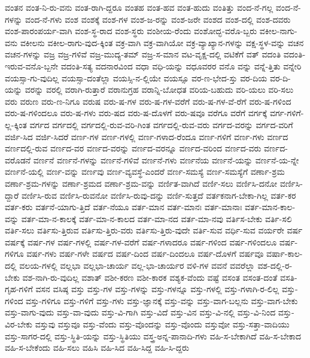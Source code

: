 {ವಂತನ
ವಂತ-ನಿ-ರು-ವನು
ವಂತ-ರಾಗಿ-ದ್ದರೂ
ವಂತಹ
ವಂತ-ಹವ
ವಂತ-ಹುದು
ವಂತಿತ್ತು
ವಂದ-ನೆ-ಗಲ್ಲ
ವಂದ-ನೆ-ಗಳನ್ನು
ವಂದ-ನೆ-ಗಳು
ವಂಶ
ವಂಶಕ್ಕೆ
ವಂಶ-ಗಳ
ವಂಶ-ಜ-ರನ್ನು
ವಂಶ-ಜರೇ
ವಂಶದ
ವಂಶ-ದಲ್ಲಿ
ವಂಶ-ದವರು
ವಂಶ-ಪಾರಂಪರ್ಯ-ವಾಗಿ
ವಂಶ-ಸ್ಥ-ರಾದ
ವಂಶ-ಸ್ಥರು
ವಂಶೀಯ-ರೆಂದು
ವಂಶೋದ್ಭ-ವರೊ-ಬ್ಬರು
ವಕೀಲ-ನಾಗು-ವನು
ವಕೀಲನು
ವಕೀಲ-ರಾಗು-ವುದ-ಕ್ಕಿಂತ
ವಕ್ರ-ವಾಗಿ
ವಕ್ರ-ವಾಗಿಯೋ
ವಕ್ರ-ವ್ಯಾಖ್ಯಾನ-ಗಳನ್ನು
ವಕ್ಷ-ಸ್ಥಳ-ವನ್ನು
ವಚನ
ವಚನ-ಗಳನ್ನು
ವಜ್ರ
ವಜ್ರ-ಗಳಿವೆ
ವಜ್ರ-ಮುದ್ಯ-ತಮ್
ವಜ್ರ-ಸ-ಮಾನ
ವಟ-ವೃಕ್ಷ-ದಲ್ಲಿ
ವಟಿಕೆಗೆ
ವತ್
ವದಂತಿ
ವದಂತಿ-ಇರುವ-ವನೊ-ಬ್ಬನೇ
ವದಂತಿ-ಸತ್ಯ
ವದನಾರವಿಂದ
ವಧಾ
ವಧಿ-ಯನ್ನು
ವಧೂವರರ
ವನೊ
ವನ್ನು
ವನ್ನೆ-ತ್ತಿತು
ವನ್ನೇರಿ
ವಯಸ್ಸಾ-ಗು-ವುದಿಲ್ಲ
ವಯಸ್ಸಾ-ದಂತೆಲ್ಲಾ
ವಯಸ್ಸಿ-ನ-ಲ್ಲಿಯೇ
ವಯಸ್ಸೂ
ವರ-ಣ-ಭೇದ-ಸ್ತು
ವರ-ದಿಯ
ವರ-ದಿ-ಯನ್ನು
ವರನ್ನು
ವರಲ್ಲಿ
ವರಾಗಿ-ರುತ್ತಾರೆ
ವರಾನುಗ್ರಹ
ವರಾನ್ನಿ-ಬೋಧತ
ವರಿಯ-ಬಹುದು
ವರಿ-ಯಲು
ವರಿ-ಸಲು
ವರು
ವರುಣ
ವರು-ಣ-ನಿಗೂ
ವರುಷ
ವರು-ಷ-ಗಳ
ವರು-ಷ-ಗಳ-ವರೆಗೆ
ವರು-ಷ-ಗಳ-ವೆ-ರೆಗೆ
ವರು-ಷ-ಗಳಿಂದ
ವರು-ಷ-ಗಳಿಂದಲೂ
ವರು-ಷ-ಗಳು
ವರು-ಷದ
ವರು-ಷ-ದೊಳಗೆ
ವರು-ಷವೂ
ವರೆಗೂ
ವರೆಗೆ
ವರ್ಗಕ್ಕೆ
ವರ್ಗ-ಗಳಿಗೆ-ಲ್ಲ-ಕ್ಕಿಂತ
ವರ್ಗದ
ವರ್ಗದಲ್ಲಿ
ವರ್ಗದಲ್ಲಿ-ರುವ-ವರಿ-ಗಿಂತ
ವರ್ಗದಲ್ಲಿ-ರುವ-ವರು
ವರ್ಗದ-ವರನ್ನು
ವರ್ಗದ-ವರಿಗೆ
ವರ್ಜಿ-ಸಿದ
ವರ್ಜಿ-ಸಿದರೆ
ವರ್ಣ-ಗಳ
ವರ್ಣ-ಗಳಲ್ಲಿ
ವರ್ಣ-ಗಳಾದ-ರೆಂದೂ
ವರ್ಣ-ಗಳಿಗೆ
ವರ್ಣ-ಗಳು
ವರ್ಣದ
ವರ್ಣದಲ್ಲಿ-ರುವ
ವರ್ಣದ-ವರ
ವರ್ಣದ-ವರನ್ನು
ವರ್ಣದ-ವರನ್ನೂ
ವರ್ಣದ-ವರಿಂದ
ವರ್ಣದ-ವರು
ವರ್ಣದ-ವರೊಡನೆ
ವರ್ಣನೆ
ವರ್ಣನೆ-ಗಳನ್ನು
ವರ್ಣನೆ-ಗಳಿವೆ
ವರ್ಣನೆ-ಗಳು
ವರ್ಣನೆಯ
ವರ್ಣನೆ-ಯನ್ನು
ವರ್ಣನೆ-ಯ-ನ್ನೇ
ವರ್ಣನೆ-ಯಲ್ಲಿ
ವರ್ಣ-ವನ್ನು
ವರ್ಣವು
ವರ್ಣ-ವ್ಯವಸ್ಥೆ-ಎಂದರೆ
ವರ್ಣ-ಸಮಸ್ಯೆ
ವರ್ಣ-ಸಮಸ್ಯೆಗೆ
ವರ್ಣಾ-ಶ್ರಮ
ವರ್ಣಾ-ಶ್ರಮ-ಗಳನ್ನು
ವರ್ಣಾ-ಶ್ರಮದ
ವರ್ಣಾ-ಶ್ರಮ-ವನ್ನು
ವರ್ಣಿತ-ವಾಗಿದೆ
ವರ್ಣಿ-ಸಲು
ವರ್ಣಿಸಿ-ದನೋ
ವರ್ಣಿಸಿ-ದ್ದಾರೆ
ವರ್ಣಿಸಿ-ರುವ
ವರ್ಣಿಸಿ-ರುವನೋ
ವರ್ಣಿಸಿ-ರುವು-ದನ್ನು
ವರ್ಣಿ-ಸುತ್ತದೆ
ವರ್ತಕನಾಗ-ಬೇಕಾ-ಗಿಲ್ಲ
ವರ್ತ-ಕರ
ವರ್ತ-ಕರು
ವರ್ತನೆ-ಯಾಗು-ತ್ತಿದೆ
ವರ್ತ-ನೆಯೂ
ವರ್ತ-ಮಾನ
ವರ್ತ-ಮಾನಃ
ವರ್ತ-ಮಾನಾಃ
ವರ್ತ-ಮಾನ-ಕಾಲ-ವನ್ನು
ವರ್ತ-ಮಾ-ನ-ಕಾಲಕ್ಕೆ
ವರ್ತ-ಮಾ-ನ-ಕಾಲದ
ವರ್ತ-ಮಾ-ನದ
ವರ್ತ-ಮಾ-ನವು
ವರ್ತಿಸ-ಬೇಕು
ವರ್ತಿ-ಸಲಿ
ವರ್ತಿ-ಸಲು
ವರ್ತಿಸು-ತ್ತಿರುವ
ವರ್ತಿಸು-ತ್ತಿರು-ವರು
ವರ್ತಿಸು-ತ್ತಿರು-ವುದೇ
ವರ್ತಿ-ಸುವ
ವರ್ಧಿ-ಸುವ
ವರ್ಯರೇ
ವರ್ಷ
ವರ್ಷಕ್ಕೆ
ವರ್ಷ-ಗಳ
ವರ್ಷ-ಗಳಲ್ಲಿ
ವರ್ಷ-ಗಳ-ವರೆಗೆ
ವರ್ಷ-ಗಳಾದರೂ
ವರ್ಷ-ಗಳಿಂದ
ವರ್ಷ-ಗಳಿಂದಲೂ
ವರ್ಷ-ಗಳಿಗೂ
ವರ್ಷ-ಗಳು
ವರ್ಷ-ಗಳೇ
ವರ್ಷದ
ವರ್ಷ-ದಿಂದ
ವರ್ಷ-ದಿಂದಲೂ
ವರ್ಷ-ದೊಳಗೆ
ವರ್ಷವೂ
ವರ್ಷಾ-ಕಾಲ-ದಲ್ಲಿ
ವಲಯ-ಗಳಲ್ಲಿ
ವಲ್ಲಭಾ
ವಲ್ಲಭಾ-ಚಾರ್ಯ
ವಲ್ಲ-ಭಾ-ಚಾರ್ಯರ
ವಳಿ-ಗಳ
ವವನೆ
ವವರೆಲ್ಲಾ
ವಶ-ದಲ್ಲಿ-ರ-ಬೇಕು
ವಶ-ನಾಗಿ-ರು-ವುದಿಲ್ಲ
ವಶಾತ್
ವಶೀ-ಕರಣ
ವಶೀ-ಕಾರಕ
ವಶ್ಯಕ-ವೆಂದು
ವಷ್ಟೆ
ವಸಂತ
ವಸಂತ-ದಂತೆ
ವಸತಿ-ಗೃಹ-ಗಳಿಗೆ
ವಸನ
ವಸಿಷ್ಠ
ವಸ್ತು
ವಸ್ತು-ಗಳ
ವಸ್ತು-ಗಳನ್ನು
ವಸ್ತು-ಗಳನ್ನೂ
ವಸ್ತು-ಗಳಲ್ಲಿ
ವಸ್ತು-ಗಳಾಗಿ-ರ-ಲಿಲ್ಲ
ವಸ್ತು-ಗಳಿಂದ
ವಸ್ತು-ಗಳಿಗೂ
ವಸ್ತು-ಗಳಿಗೆ
ವಸ್ತು-ಗಳು
ವಸ್ತು-ಜ್ಞಾನಕ್ಕೆ
ವಸ್ತು-ವನ್ನು
ವಸ್ತು-ವಾಗ-ಬಲ್ಲನು
ವಸ್ತು-ವಾಗ-ಬೇಕು
ವಸ್ತು-ವಾಗು-ವುದು
ವಸ್ತು-ವಾ-ವುದು
ವಸ್ತು-ವಿ-ಗಾಗಿ
ವಸ್ತು-ವಿದೆ
ವಸ್ತು-ವಿನ
ವಸ್ತು-ವಿ-ನಲ್ಲಿ
ವಸ್ತು-ವಿ-ನಿಂದ
ವಸ್ತು-ವಿರ-ಬೇಕು
ವಸ್ತುವು
ವಸ್ತುವೂ
ವಸ್ತು-ವೆಂದು
ವಸ್ತು-ವೊಂದನ್ನು
ವಸ್ತು-ವೊಂದು
ವಸ್ತುವೋ
ವಸ್ತು-ಸತ್ತಾ-ವಾದಿಯು
ವಸ್ತು-ಸಾಗರ-ದಲ್ಲಿ
ವಸ್ತು-ಸ್ಥಿತಿ-ಯನ್ನು
ವಸ್ತು-ಸ್ಥಿತಿಯು
ವಸ್ತ್ರ-ಅನ್ನ-ಪಾನಾದಿ-ಗಳು
ವಹಿ-ಸ-ಬೇಕಾಗಿದೆ
ವಹಿ-ಸ-ಬೇಕಾದ
ವಹಿ-ಸ-ಬೇಕೆಂದು
ವಹಿ-ಸಲು
ವಹಿಸಿ
ವಹಿ-ಸಿದ
ವಹಿ-ಸಿದ್ದ
ವಹಿ-ಸಿ-ದ್ದರು
}

